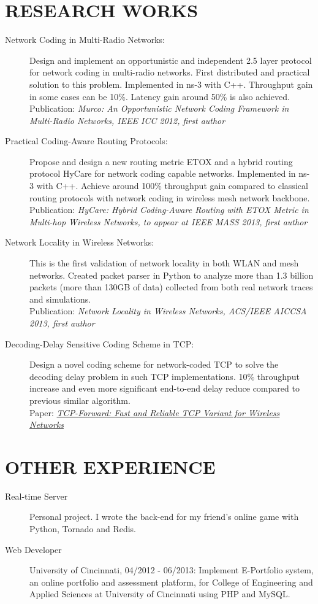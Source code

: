 \documentclass[line]{res}
\begin{document}
\begin{resume}
	\section{RESEARCH WORKS}
	\begin{description}
		\item[Network Coding in Multi-Radio Networks:]
			Design and implement an opportunistic and independent 2.5 layer protocol for network coding in multi-radio networks. First distributed and practical solution to this problem. Implemented in ns-3 with C++. Throughput gain in some cases can be 10\%. Latency gain around 50\% is also achieved. \\
			Publication: \emph{Murco: An Opportunistic Network Coding Framework in Multi-Radio Networks, IEEE ICC 2012, first author}
		\item[Practical Coding-Aware Routing Protocols:]
			Propose and design a new routing metric ETOX and a hybrid routing protocol HyCare for network coding capable networks. Implemented in ns-3 with C++. Achieve around 100\% throughput gain compared to classical routing protocols with network coding in wireless mesh network backbone.\\
			Publication: \emph{HyCare: Hybrid Coding-Aware Routing with ETOX Metric in Multi-hop Wireless Networks, to appear at IEEE MASS 2013, first author}
		\item[Network Locality in Wireless Networks:]
			This is the first validation of network locality in both WLAN and mesh networks. Created packet parser in Python to analyze more than 1.3 billion packets (more than 130GB of data) collected from both real network traces and simulations. \\
			Publication: \emph{Network Locality in Wireless Networks, ACS/IEEE AICCSA 2013, first author}
		\item [Decoding-Delay Sensitive Coding Scheme in TCP:]
			Design a novel coding scheme for network-coded TCP to solve the decoding delay problem in such TCP implementations. 10\% throughput increase and even more significant end-to-end delay reduce compared to previous similar algorithm. \\
			Paper: \href{http://arxiv.org/abs/1408.2626}{\emph{TCP-Forward: Fast and Reliable TCP Variant for Wireless Networks}}
	\end{description}
	
	\section{OTHER EXPERIENCE}
	\begin{description}
		\item[Real-time Server] Personal project. I wrote the back-end for my friend's online game with Python, Tornado and Redis.
		\item[Web Developer] University of Cincinnati, 04/2012 - 06/2013: Implement E-Portfolio system, an online portfolio and assessment platform, for College of Engineering and Applied Sciences at University of Cincinnati using PHP and MySQL. 
	\end{description}

\end{resume}
\end{document}
